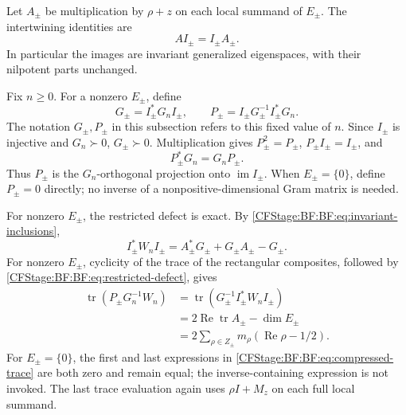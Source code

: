 Let \(A_\pm\) be multiplication by \(\rho+z\) on each local
summand of \(E_\pm\).  The intertwining identities are
\begin{equation}
AI_\pm=I_\pm A_\pm.
\tag{BF.27}\label{CFStage:BF:BF:eq:invariant-inclusions}
\end{equation}
In particular the images are invariant generalized eigenspaces, with
their nilpotent parts unchanged.

Fix \(n\ge0\).  For a nonzero \(E_\pm\), define
\begin{equation}
G_\pm=I_\pm^*G_nI_\pm,\qquad
P_\pm=I_\pm G_\pm^{-1}I_\pm^*G_n.
\tag{BF.28}\label{CFStage:BF:BF:eq:orthogonal-projections}
\end{equation}
The notation \(G_\pm,P_\pm\) in this subsection refers to this
fixed value of \(n\).
Since \(I_\pm\) is injective and \(G_n\succ0\), \(G_\pm\succ0\).
Multiplication gives \(P_\pm^2=P_\pm\),
\(P_\pm I_\pm=I_\pm\), and
\[
P_\pm^*G_n=G_nP_\pm.
\]
Thus \(P_\pm\) is the \(G_n\)-orthogonal projection onto
\(\operatorname{im}I_\pm\).  When \(E_\pm=\{0\}\), define
\(P_\pm=0\) directly; no inverse of a nonpositive-dimensional
Gram matrix is needed.

For nonzero \(E_\pm\), the restricted defect is exact.
By \eqref{CFStage:BF:BF:eq:invariant-inclusions},
\begin{equation}
I_\pm^*W_nI_\pm
 =A_\pm^*G_\pm+G_\pm A_\pm-G_\pm.
\tag{BF.29}\label{CFStage:BF:BF:eq:restricted-defect}
\end{equation}
For nonzero \(E_\pm\), cyclicity of the trace of the rectangular
composites, followed by \eqref{CFStage:BF:BF:eq:restricted-defect}, gives
\begin{equation}
\begin{split}
\operatorname{tr}(P_\pm G_n^{-1}W_n)
&=\operatorname{tr}\!\left(
  G_\pm^{-1}I_\pm^*W_nI_\pm\right)\\
&=2\operatorname{Re}\operatorname{tr}A_\pm-\dim E_\pm\\
&=2\sum_{\rho\in Z_\pm}
        m_\rho(\operatorname{Re}\rho-1/2).
\end{split}
\tag{BF.30}\label{CFStage:BF:BF:eq:compressed-trace}
\end{equation}
For \(E_\pm=\{0\}\), the first and last expressions in
\eqref{CFStage:BF:BF:eq:compressed-trace} are both zero and remain equal;
the inverse-containing expression is not invoked.
The last trace evaluation again uses
\(\rho I+M_z\) on each full local summand.

